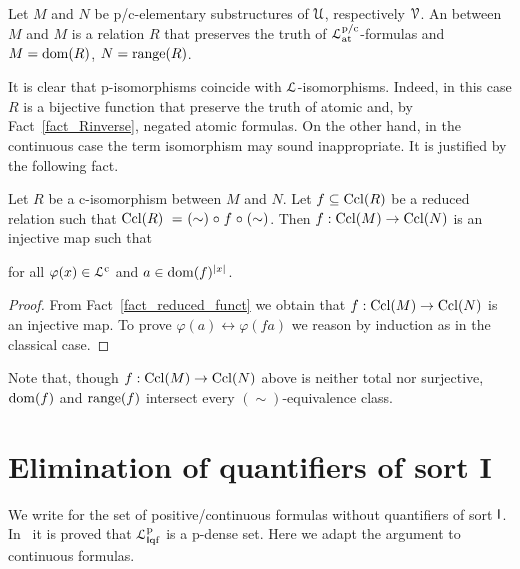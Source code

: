 \documentclass{amsproc}
\renewcommand*{\emph}[1]{%
   \smash{\tikz[baseline]\node[rectangle, fill=teal!25, rounded corners, inner xsep=0.5ex, inner ysep=0.2ex, anchor=base, minimum height = 2.7ex]{\strut #1};}}
\begin{document}
{\begin{definition}\label{def_ciso}
  Let $M$ and $N$ be p/c-elementary substructures of ${\EuScript U}$, respectively ${\EuScript V}$.
  An \emph{p/c-isomorphism\/} between $M$ and $M$ is a relation $R$ that preserves the truth of ${\EuScript L}^{\rm p/c}_{\rm at}$-formulas and $M={\rm dom}(R)$,  $N={\rm range}(R)$.
\end{definition}

 It is clear that p-isomorphisms coincide with ${\EuScript L}$-isomorphisms. 
 Indeed, in this case $R$ is a bijective function that preserve the truth of atomic and, by Fact~\ref{fact_Rinverse}, negated atomic formulas.
 On the other hand, in the continuous case the term isomorphism may sound inappropriate.
 It is justified by the following fact.

\begin{fact}\label{fact_c_iso}
  Let $R$ be a c-isomorphism between $M$ and $N$.
  Let $f\subseteq{\rm Ccl}(R)$ be a reduced relation such that ${\rm Ccl}(R)\ =\ \mathrel{(\sim)}\circ \mathrel{f}\circ\mathrel{(\sim)}$.
  Then $f:{\rm Ccl}(M)\rightarrow{\rm Ccl}(N)$ is an injective map such that 
  
  \hfill for all $\varphi(x)\in{\EuScript L}^{\rm c}$ and $a\in{\rm dom}(f)^{|x|}$.
\end{fact}

\begin{proof}
  From Fact~\ref{fact_reduced_funct} we obtain that $f:{\rm Ccl}(M)\rightarrow{\rm Ccl}(N)$ is an injective map.
  To prove $\varphi(a)\leftrightarrow\varphi(fa)$ we reason by induction as in the classical case.
\end{proof}

Note that, though $f:{\rm Ccl}(M)\rightarrow{\rm Ccl}(N)$ above is neither total nor surjective, ${\rm dom}(f)$ and ${\rm range}(f)$ intersect every $(\sim)$-equivalence class.

\section{Elimination of quantifiers of sort \textsf{I}}\label{cIelimination}

We write \emph{${\EuScript L}^{\rm p/c}_{{\sf I}{\rm qf}}$} for the set of positive/continuous formulas without quantifiers of sort ${\sf I}$.
In~\cite{clcl} it is proved that ${\EuScript L}^{\rm p}_{{\sf I}{\rm qf}}$ is a p-dense set.
Here we adapt the argument to continuous formulas.

}
\end{document}
